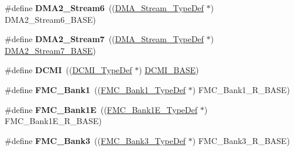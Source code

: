 \begin{DoxyCompactItemize}
\item 
\mbox{\label{group___peripheral__declaration_ga11a00b283e0911cd427e277e5a314ccc}} 
\#define {\bfseries D\+M\+A2\+\_\+\+Stream6}~((\mbox{\hyperlink{struct_d_m_a___stream___type_def}{D\+M\+A\+\_\+\+Stream\+\_\+\+Type\+Def}} $\ast$) D\+M\+A2\+\_\+\+Stream6\+\_\+\+B\+A\+SE)
\item 
\mbox{\label{group___peripheral__declaration_gacc135dbca0eca67d5aa0abc555f053ce}} 
\#define {\bfseries D\+M\+A2\+\_\+\+Stream7}~((\mbox{\hyperlink{struct_d_m_a___stream___type_def}{D\+M\+A\+\_\+\+Stream\+\_\+\+Type\+Def}} $\ast$) \mbox{\hyperlink{group___peripheral__memory__map_gaa9faa708ad2440d24eb1064cba9bb06d}{D\+M\+A2\+\_\+\+Stream7\+\_\+\+B\+A\+SE}})
\item 
\mbox{\label{group___peripheral__declaration_ga049d9f61cb078d642e68f3c22bb6d90c}} 
\#define {\bfseries D\+C\+MI}~((\mbox{\hyperlink{struct_d_c_m_i___type_def}{D\+C\+M\+I\+\_\+\+Type\+Def}} $\ast$) \mbox{\hyperlink{group___peripheral__memory__map_ga55b794507e021135486de57129a2505c}{D\+C\+M\+I\+\_\+\+B\+A\+SE}})
\item 
\mbox{\label{group___peripheral__declaration_gadbd2f968da05cf7bb497d2ce38ae88b6}} 
\#define {\bfseries F\+M\+C\+\_\+\+Bank1}~((\mbox{\hyperlink{struct_f_m_c___bank1___type_def}{F\+M\+C\+\_\+\+Bank1\+\_\+\+Type\+Def}} $\ast$) F\+M\+C\+\_\+\+Bank1\+\_\+\+R\+\_\+\+B\+A\+SE)
\item 
\mbox{\label{group___peripheral__declaration_ga91eebdd476549799293eaa7a166a3cb3}} 
\#define {\bfseries F\+M\+C\+\_\+\+Bank1E}~((\mbox{\hyperlink{struct_f_m_c___bank1_e___type_def}{F\+M\+C\+\_\+\+Bank1\+E\+\_\+\+Type\+Def}} $\ast$) F\+M\+C\+\_\+\+Bank1\+E\+\_\+\+R\+\_\+\+B\+A\+SE)
\item 
\mbox{\label{group___peripheral__declaration_ga208aba2ade94120efe3b94348e980890}} 
\#define {\bfseries F\+M\+C\+\_\+\+Bank3}~((\mbox{\hyperlink{struct_f_m_c___bank3___type_def}{F\+M\+C\+\_\+\+Bank3\+\_\+\+Type\+Def}} $\ast$) F\+M\+C\+\_\+\+Bank3\+\_\+\+R\+\_\+\+B\+A\+SE)
\item 
\mbox{\label{group___peripheral__declaration_gae3dcd4e05d7b9ffd6af1bd6c0d4f6960}} 

\end{DoxyCompactItemize}
